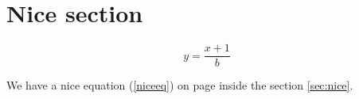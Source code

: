 \documentclass{article}
\begin{document}
\section{Nice section \label{sec:nice}}
\begin{equation}
     y=\frac{x+1}{b} \label{niceEeq}
\end{equation}

We have a nice equation (\ref{niceeq}) on page \pageref{niceeq} inside the section \ref{sec:nice}.
\end{document}
